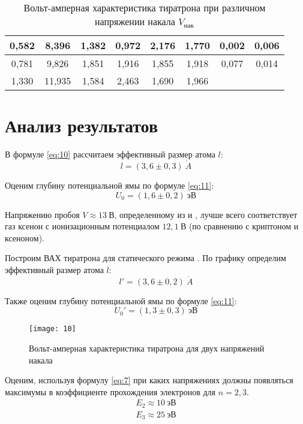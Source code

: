 \documentclass[a4paper, 12pt]{article}
\begin{document}
\begin{table}[H]
\begin{tabular}{|c|c|c|c|c|c|cc}
0,582 & 8,396  & 1,382      & 0,972     & 2,176 & 1,770  & \multicolumn{1}{c|}{0,002} & \multicolumn{1}{c|}{0,006} \\ \hline
0,781 & 9,826  & 1,851      & 1,916     & 1,855 & 1,918  & \multicolumn{1}{c|}{0,077} & \multicolumn{1}{c|}{0,014} \\ \hline
1,330 & 11,935 & 1,584      & 2,463     & 1,690 & 1,966  &                            &                            \\ \cline{1-6}
\end{tabular}\caption{Вольт-амперная характеристика тиратрона при
различном напряжении накала $V_\text{нак}$}
\end{table}





\section{Анализ результатов}

В формуле \eqref{eq:10} рассчитаем эффективный размер атома $l$:
\[
    l = (3,6 \pm 0,3)\: \mathring{A}
\]

Оценим глубину потенциальной ямы по формуле \eqref{eq:11}:
\[
    U_0 = (1,6 \pm 0,2)\: \text{эВ}
\]

Напряжению пробоя $V \approx 13\: \text{В}$, определенному из
 и , лучше всего соответствует газ ксенон с
ионизационным потенциалом $12,1\: \text{В}$ (по сравнению с криптоном
и ксеноном).

Построим ВАХ тиратрона для статического режима . По
графику определим эффективный размер атома $l$:
\[
    l' = (3,6 \pm 0,2)\: \mathring{A}
\]

Также оценим глубину потенциальной ямы по формуле \eqref{eq:11}:
\[
    U_0' = (1,3 \pm 0,3)\: \text{эВ}
\]


\begin{figure}[H]
    \texttt{[image: 10]} 
    \caption{Вольт-амперная характеристика тиратрона для двух
    напряжений накала}
    \label{fig:10}
\end{figure}

Оценим, используя формулу \eqref{eq:7} при каких напряжениях должны
появляться максимумы в коэффициенте прохождения электронов для $n = 2,
3$.
\begin{equation*}
    \begin{gathered}
        E_2 \approx 10\: \text{эВ}\\
        E_3 \approx 25\: \text{эВ}
    \end{gathered}
\end{equation*}
\end{document}
